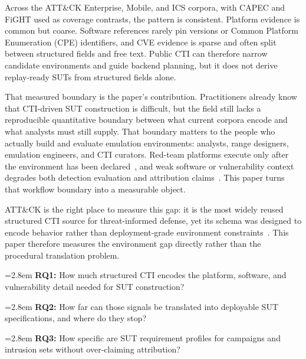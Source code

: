 \documentclass[sigconf]{acmart}
\newcommand{\attack}{ATT\&CK\xspace}
\begin{document}
Across the \attack{} Enterprise, Mobile, and ICS corpora, with CAPEC and FiGHT used as coverage contrasts, the pattern is consistent. Platform evidence is common but coarse. Software references rarely pin versions or Common Platform Enumeration (CPE) identifiers, and CVE evidence is sparse and often split between structured fields and free text. Public CTI can therefore narrow candidate environments and guide backend planning, but it does not derive replay-ready SUTs from structured fields alone.

That measured boundary is the paper's contribution. Practitioners already know that CTI-driven SUT construction is difficult, but the field still lacks a reproducible quantitative boundary between what current corpora encode and what analysts must still supply. That boundary matters to the people who actually build and evaluate emulation environments: analysts, range designers, emulation engineers, and CTI curators. Red-team platforms execute only after the environment has been declared~\cite{applebaum2016caldera,redcanary2023art,orbinato2024laccolith,damodaran2025automated,wang2024sands}, and weak software or vulnerability context degrades both detection evaluation and attribution claims~\cite{milajerdi2019holmes,han2020unicorn,DBLP:conf/uss/Dong0NS0LLX23,DBLP:conf/uss/YangXXLZ23,DBLP:conf/ccs/LvGQCZCJ24,DBLP:conf/uss/SahaMBCVL25,DBLP:conf/ccs/YuldoshkhujaevJ25}. This paper turns that workflow boundary into a measurable object.

ATT\&CK is the right place to measure this gap: it is the most widely reused structured CTI source for threat-informed defense, yet its schema was designed to encode behavior rather than deployment-grade environment constraints~\cite{strom2018mitre,DBLP:conf/uss/VirkudIR00024,10.1145/3634737.3645012,DBLP:conf/ccs/DongLJLWHXCLGC23}. This paper therefore measures the environment gap directly rather than the procedural translation problem.

\noindent\hangindent=2.8em
\textbf{RQ1:} How much structured CTI encodes the platform, software, and vulnerability detail needed for SUT construction?

\noindent\hangindent=2.8em
\textbf{RQ2:} How far can those signals be translated into deployable SUT specifications, and where do they stop?

\noindent\hangindent=2.8em
\textbf{RQ3:} How specific are SUT requirement profiles for campaigns and intrusion sets without over-claiming attribution?
\end{document}
